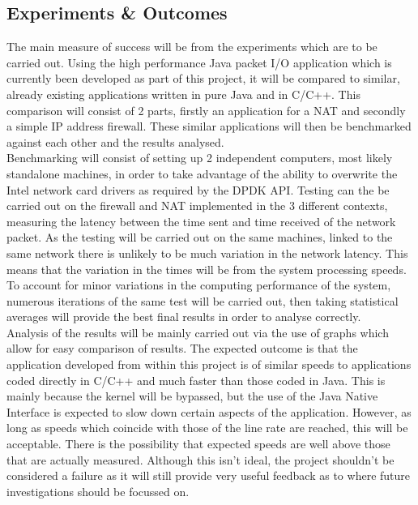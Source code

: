 \documentclass[a4paper, titlepage]{article}
\begin{document}
\subsection{Experiments \& Outcomes}
The main measure of success will be from the experiments which are to be carried out. Using the high performance Java packet I/O application which is currently been developed as part of this project, it will be compared to similar, already existing applications written in pure Java and in C/C++. This comparison will consist of 2 parts, firstly an application for a NAT and secondly a simple IP address firewall. These similar applications will then be benchmarked against each other and the results analysed. \\
\newline
Benchmarking will consist of setting up 2 independent computers, most likely standalone machines, in order to take advantage of the ability to overwrite the Intel network card drivers as required by the DPDK API. Testing can the be carried out on the firewall and NAT implemented in the 3 different contexts, measuring the latency between the time sent and time received of the network packet. As the testing will be carried out on the same machines, linked to the same network there is unlikely to be much variation in the network latency. This means that the variation in the times will be from the system processing speeds. To account for minor variations in the computing performance of the system, numerous iterations of the same test will be carried out, then taking statistical averages will provide the best final results in order to analyse correctly. \\
\newline
Analysis of the results will be mainly carried out via the use of graphs which allow for easy comparison of results. The expected outcome is that the application developed from within this project is of similar speeds to applications coded directly in C/C++ and much faster than those coded in Java. This is mainly because the kernel will be bypassed, but the use of the Java Native Interface is expected to slow down certain aspects of the application. However, as long as speeds which coincide with those of the line rate are reached, this will be acceptable. There is the possibility that expected speeds are well above those that are actually measured. Although this isn't ideal, the project shouldn't be considered a failure as it will still provide very useful feedback as to where future investigations should be focussed on.
\end{document}
